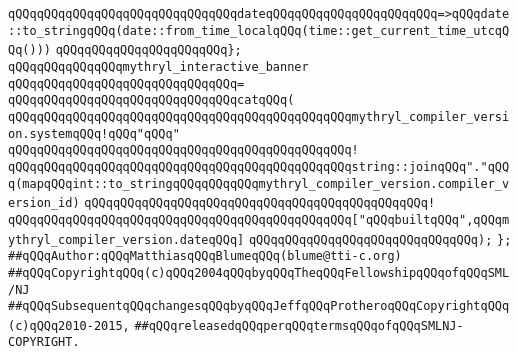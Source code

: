 \verb|qQQqqQQqqQQqqQQqqQQqqQQqqQQqqQQqdateqQQqqQQqqQQqqQQqqQQqqQQq=>qQQqdate::to_stringqQQq(date::from_time_localqQQq(time::get_current_time_utcqQQq()))|\newline
\verb|qQQqqQQqqQQqqQQqqQQqqQQq};|\newline
\newline
\verb|qQQqqQQqqQQqqQQqmythryl_interactive_banner|\newline
\verb|qQQqqQQqqQQqqQQqqQQqqQQqqQQqqQQq=|\newline
\verb|qQQqqQQqqQQqqQQqqQQqqQQqqQQqqQQqcatqQQq(|\newline
\verb|qQQqqQQqqQQqqQQqqQQqqQQqqQQqqQQqqQQqqQQqqQQqqQQqmythryl_compiler_version.systemqQQq!qQQq"qQQq"|\newline
\verb|qQQqqQQqqQQqqQQqqQQqqQQqqQQqqQQqqQQqqQQqqQQqqQQq!|\newline
\verb|qQQqqQQqqQQqqQQqqQQqqQQqqQQqqQQqqQQqqQQqqQQqqQQqstring::joinqQQq"."qQQq(mapqQQqint::to_stringqQQqqQQqqQQqmythryl_compiler_version.compiler_version_id)|\newline
\verb|qQQqqQQqqQQqqQQqqQQqqQQqqQQqqQQqqQQqqQQqqQQqqQQq!|\newline
\verb|qQQqqQQqqQQqqQQqqQQqqQQqqQQqqQQqqQQqqQQqqQQqqQQq["qQQqbuiltqQQq",qQQqmythryl_compiler_version.dateqQQq]|\newline
\verb|qQQqqQQqqQQqqQQqqQQqqQQqqQQqqQQq);|\newline
\verb|};|\newline
\newline
\newline
\verb|##qQQqAuthor:qQQqMatthiasqQQqBlumeqQQq(blume@tti-c.org)|\newline
\verb|##qQQqCopyrightqQQq(c)qQQq2004qQQqbyqQQqTheqQQqFellowshipqQQqofqQQqSML/NJ|\newline
\verb|##qQQqSubsequentqQQqchangesqQQqbyqQQqJeffqQQqProtheroqQQqCopyrightqQQq(c)qQQq2010-2015,|\newline
\verb|##qQQqreleasedqQQqperqQQqtermsqQQqofqQQqSMLNJ-COPYRIGHT.|\newline

